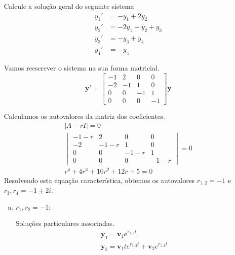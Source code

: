 \begin{exeresol}
  Calcule a solução geral do seguinte sistema
  \begin{align}
    y_1' &= -y_1 + 2y_2 \label{eq:exeresol_edosis1_1}\\
    y_2' &= -2y_1 - y_2 + y_3 \label{eq:exeresol_edosis1_2}\\
    y_3' &= -y_3 + y_4 \label{eq:exeresol_edosis1_3}\\
    y_4' &= -y_4 \label{eq:exeresol_edosis1_4}
  \end{align}
\end{exeresol}
\begin{resol}
  Vamos reescrever o sistema na sua forma matricial.
  \begin{equation}
    \pmb{y}' =
    \begin{bmatrix}
      -1 & 2 & 0 & 0 \\
      -2 & -1 & 1 & 0 \\
      0 & 0 & -1 & 1 \\
      0 & 0 & 0 & -1
    \end{bmatrix}\pmb{y}
  \end{equation}

  Calculamos os autovalores da matriz dos coeficientes.
  \begin{gather}
    |A-rI| = 0 \\
    \begin{vmatrix}
      -1-r & 2 & 0 & 0 \\
      -2 & -1-r & 1 & 0 \\
      0 & 0 & -1-r & 1 \\
      0 & 0 & 0 & -1-r 
    \end{vmatrix} = 0 \\
    r^4 + 4r^3 + 10r^2 + 12r + 5 = 0
  \end{gather}
  Resolvendo esta equação característica, obtemos os autovalores $r_{1,2} = -1$ e $r_3,r_4 = -1 \pm 2i$.

  \begin{enumerate}[a)]
  \item $r_1,r_2=-1$:

    Soluções particulares associadas.
    \begin{align}
      \pmb{y}_1 = \pmb{v}_1e^{r_{1,2}t},\\
      \pmb{y}_2 = \pmb{v}_1te^{r_{1,2}t} + \pmb{v}_2e^{r_{1,2}t}
    \end{align}


\end{enumerate}
\end{resol}
